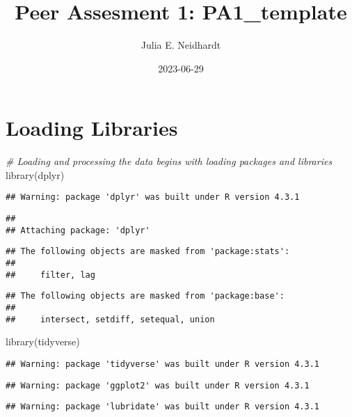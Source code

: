 \documentclass[
]{article}
\title{Peer Assesment 1: PA1\_template}
\author{Julia E. Neidhardt}
\date{2023-06-29}
\newenvironment{Shaded}{\begin{snugshade}}{\end{snugshade}}
\newcommand{\CommentTok}[1]{\textcolor[rgb]{0.56,0.35,0.01}{\textit{#1}}}
\newcommand{\FunctionTok}[1]{\textcolor[rgb]{0.00,0.00,0.00}{#1}}
\newcommand{\NormalTok}[1]{#1}
\begin{document}
\maketitle

\hypertarget{loading-libraries}{%
\section{Loading Libraries}\label{loading-libraries}}

\begin{Shaded}
\begin{Highlighting}[]
\CommentTok{\# Loading and processing the data begins with loading packages and libraries}
\FunctionTok{library}\NormalTok{(dplyr)}
\end{Highlighting}
\end{Shaded}

\begin{verbatim}
## Warning: package 'dplyr' was built under R version 4.3.1
\end{verbatim}

\begin{verbatim}
## 
## Attaching package: 'dplyr'
\end{verbatim}

\begin{verbatim}
## The following objects are masked from 'package:stats':
## 
##     filter, lag
\end{verbatim}

\begin{verbatim}
## The following objects are masked from 'package:base':
## 
##     intersect, setdiff, setequal, union
\end{verbatim}

\begin{Shaded}
\begin{Highlighting}[]
\FunctionTok{library}\NormalTok{(tidyverse)}
\end{Highlighting}
\end{Shaded}

\begin{verbatim}
## Warning: package 'tidyverse' was built under R version 4.3.1
\end{verbatim}

\begin{verbatim}
## Warning: package 'ggplot2' was built under R version 4.3.1
\end{verbatim}

\begin{verbatim}
## Warning: package 'lubridate' was built under R version 4.3.1
\end{verbatim}
\end{document}
